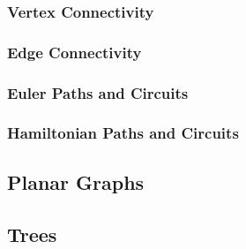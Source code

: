 \documentclass[a4paper, 10pt]{article}
\begin{document}
\subsubsection{Vertex Connectivity}

\subsubsection{Edge Connectivity}

\subsubsection{Euler Paths and Circuits}

\subsubsection{Hamiltonian Paths and Circuits}

\subsection{Planar Graphs}

\subsection{Trees}
\end{document}
